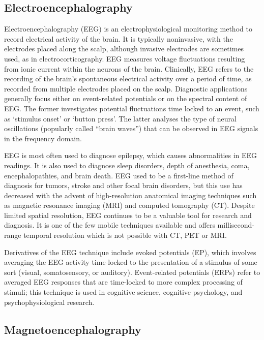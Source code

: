 \hypertarget{electroencephalography}{%
\subsection{Electroencephalography}\label{electroencephalography}}

Electroencephalography (EEG) is an electrophysiological monitoring method to record electrical activity of the brain. It is typically noninvasive, with the electrodes placed along the scalp, although invasive electrodes are sometimes used, as in electrocorticography. EEG measures voltage fluctuations resulting from ionic current within the neurons of the brain. Clinically, EEG refers to the recording of the brain's spontaneous electrical activity over a period of time, as recorded from multiple electrodes placed on the scalp. Diagnostic applications generally focus either on event-related potentials or on the spectral content of EEG. The former investigates potential fluctuations time locked to an event, such as `stimulus onset' or `button press'. The latter analyses the type of neural oscillations (popularly called ``brain waves'') that can be observed in EEG signals in the frequency domain.

EEG is most often used to diagnose epilepsy, which causes abnormalities in EEG readings. It is also used to diagnose sleep disorders, depth of anesthesia, coma, encephalopathies, and brain death. EEG used to be a first-line method of diagnosis for tumors, stroke and other focal brain disorders, but this use has decreased with the advent of high-resolution anatomical imaging techniques such as magnetic resonance imaging (MRI) and computed tomography (CT). Despite limited spatial resolution, EEG continues to be a valuable tool for research and diagnosis. It is one of the few mobile techniques available and offers millisecond-range temporal resolution which is not possible with CT, PET or MRI.

Derivatives of the EEG technique include evoked potentials (EP), which involves averaging the EEG activity time-locked to the presentation of a stimulus of some sort (visual, somatosensory, or auditory). Event-related potentials (ERPs) refer to averaged EEG responses that are time-locked to more complex processing of stimuli; this technique is used in cognitive science, cognitive psychology, and psychophysiological research.

\hypertarget{magnetoencephalography}{%
\subsection{Magnetoencephalography}\label{magnetoencephalography}}

